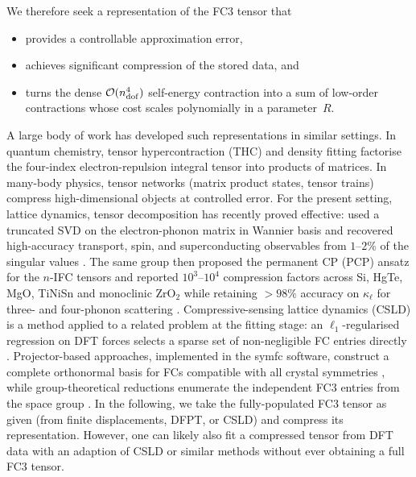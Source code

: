 We therefore seek a representation of the FC3 tensor that
\begin{itemize}
    \item provides a controllable approximation error,
    \item achieves significant compression of the stored data, and
    \item turns the dense $\mathcal{O}(n_{\mathrm{dof}}^{4})$ self-energy contraction into a sum of low-order
          contractions whose cost scales polynomially in a parameter~$R$.
\end{itemize}
A large body of work has developed such representations in similar settings.
In quantum chemistry, tensor hypercontraction (THC) \cite{hohenstein_tensor_2012,
parrish_tensor_2012} and density fitting \cite{whitten_coulombic_1973} factorise the four-index
electron-repulsion integral tensor into products of matrices. In many-body physics, tensor
networks (matrix product states, tensor trains) \cite{oseledets_tensor-train_2011,
cichocki_tensor_2016} compress high-dimensional objects at controlled error. For the present
setting, lattice dynamics, tensor decomposition has recently proved effective:
\citeauthor{luo_data-driven_2024} used a truncated SVD on the electron-phonon matrix in Wannier
basis and recovered high-accuracy transport, spin, and superconducting observables from $1$--$2\%$
of the singular values \cite{luo_data-driven_2024}. The same group then proposed the permanent
CP (PCP) ansatz for the $n$-IFC tensors and reported $10^{3}$--$10^{4}$ compression factors
across Si, HgTe, MgO, TiNiSn and monoclinic ZrO$_2$ while retaining $>98\%$ accuracy on
$\kappa_\ell$ for three- and four-phonon scattering \cite{luo_tensor_2025}. Compressive-sensing
lattice dynamics (CSLD) is a method applied to a related problem at the fitting stage: an
$\ell_1$-regularised regression on DFT forces selects a sparse set of non-negligible FC entries
directly \cite{zhou_lattice_2014, zhou_compressive_2019}. Projector-based approaches, implemented
in the symfc software, construct a complete orthonormal basis for FCs compatible with all
crystal symmetries \cite{seko_projector-based_2024}, while group-theoretical reductions enumerate
the independent FC3 entries from the space group \cite{fu_group_2019}. In the following, we take
the fully-populated FC3 tensor as given (from finite displacements, DFPT, or CSLD) and compress
its representation. However, one can likely also fit a compressed tensor from DFT data with an
adaption of CSLD or similar methods without ever obtaining a full FC3 tensor.

